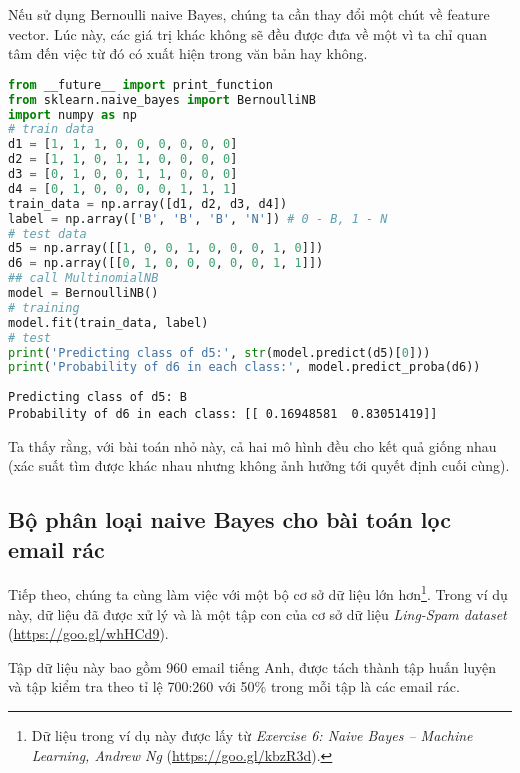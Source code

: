 Nếu sử dụng Bernoulli naive Bayes, chúng ta cần thay đổi một chút về
feature vector. Lúc này, các giá trị khác không sẽ đều được đưa về một vì ta chỉ
quan tâm đến việc từ đó có xuất hiện trong văn bản hay không.
\begin{lstlisting}[language=Python]
from __future__ import print_function 
from sklearn.naive_bayes import BernoulliNB 
import numpy as np  
# train data 
d1 = [1, 1, 1, 0, 0, 0, 0, 0, 0] 
d2 = [1, 1, 0, 1, 1, 0, 0, 0, 0] 
d3 = [0, 1, 0, 0, 1, 1, 0, 0, 0] 
d4 = [0, 1, 0, 0, 0, 0, 1, 1, 1] 
train_data = np.array([d1, d2, d3, d4]) 
label = np.array(['B', 'B', 'B', 'N']) # 0 - B, 1 - N  
# test data 
d5 = np.array([[1, 0, 0, 1, 0, 0, 0, 1, 0]]) 
d6 = np.array([[0, 1, 0, 0, 0, 0, 0, 1, 1]]) 
## call MultinomialNB 
model = BernoulliNB() 
# training  
model.fit(train_data, label) 
# test 
print('Predicting class of d5:', str(model.predict(d5)[0])) 
print('Probability of d6 in each class:', model.predict_proba(d6)) 
\end{lstlisting}
\kq  
\begin{lstlisting}
Predicting class of d5: B 
Probability of d6 in each class: [[ 0.16948581  0.83051419]] 
\end{lstlisting}
 
Ta thấy rằng, với bài toán nhỏ này, cả hai mô hình đều cho kết quả giống nhau (xác suất tìm được khác nhau nhưng không ảnh hưởng tới quyết định cuối cùng).  
 
 
 
\subsection{Bộ phân loại naive Bayes cho bài toán lọc email rác}
Tiếp theo, chúng ta cùng làm việc với một bộ cơ sở dữ liệu lớn hơn\footnote{Dữ liệu trong ví dụ này được lấy từ \textit{Exercise 6: Naive Bayes -- Machine Learning, Andrew Ng} (\url{https://goo.gl/kbzR3d}).}. Trong ví dụ này, dữ liệu đã được xử lý và là một tập con của cơ sở dữ liệu \textit{Ling-Spam dataset} (\url{https://goo.gl/whHCd9}).  
 
 

Tập dữ liệu này bao gồm 960 email tiếng Anh, được tách thành tập huấn luyện và tập kiểm tra theo tỉ lệ 700:260 với 50\% trong mỗi tập là các email rác.  

